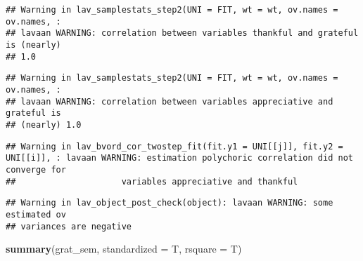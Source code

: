 \documentclass[
]{article}
\newenvironment{Shaded}{\begin{snugshade}}{\end{snugshade}}
\newcommand{\AttributeTok}[1]{\textcolor[rgb]{0.13,0.29,0.53}{#1}}
\newcommand{\FunctionTok}[1]{\textcolor[rgb]{0.13,0.29,0.53}{\textbf{#1}}}
\newcommand{\NormalTok}[1]{#1}
\begin{document}
\begin{verbatim}
## Warning in lav_samplestats_step2(UNI = FIT, wt = wt, ov.names = ov.names, :
## lavaan WARNING: correlation between variables thankful and grateful is (nearly)
## 1.0
\end{verbatim}

\begin{verbatim}
## Warning in lav_samplestats_step2(UNI = FIT, wt = wt, ov.names = ov.names, :
## lavaan WARNING: correlation between variables appreciative and grateful is
## (nearly) 1.0
\end{verbatim}

\begin{verbatim}
## Warning in lav_bvord_cor_twostep_fit(fit.y1 = UNI[[j]], fit.y2 = UNI[[i]], : lavaan WARNING: estimation polychoric correlation did not converge for
##                     variables appreciative and thankful
\end{verbatim}

\begin{verbatim}
## Warning in lav_object_post_check(object): lavaan WARNING: some estimated ov
## variances are negative
\end{verbatim}

\begin{Shaded}
\begin{Highlighting}[]
\FunctionTok{summary}\NormalTok{(grat\_sem, }\AttributeTok{standardized =}\NormalTok{ T, }\AttributeTok{rsquare =}\NormalTok{ T)}
\end{Highlighting}
\end{Shaded}
\end{document}
